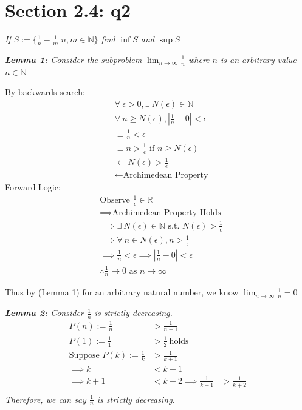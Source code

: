 \documentclass[11pt]{article}
\newcommand{\question}[1]{
    \begin{mdframed}[
        linecolor=gray,       %
        linewidth=0.5pt,      %
        innertopmargin=10pt,  %
        innerbottommargin=10pt %
    ]
    \centering \itshape \color{gray} #1
    \end{mdframed}
}
\newcommand{\subp}[1]{
    \begin{mdframed}[
        linewidth=0.5pt,      %
        innertopmargin=10pt,  %
        innerbottommargin=10pt %
    ]
    \centering \itshape #1
    \end{mdframed}
}
\theoremstyle{plain}
\begin{document}
\section*{Section 2.4: q2}
\question{If $S := \{ \frac{1}{n}-\frac{1}{m} | n,m \in \mathbb{N} \}$ find $\inf S$ and $\sup S$}
\pagebreak
\subp{
	\textbf{Lemma 1:} Consider the subproblem  $\lim_{n \to \infty} \frac{1}{n}$ where $n$ is an arbitrary value $n \in \mathbb{N}$

	By backwards search:
	$$
		\begin{aligned}
			 & \forall ~\epsilon > 0, \exists ~N(\epsilon) \in \mathbb{N}    \\
			 & \forall ~ n \geq N(\epsilon), |\frac{1}{n} - 0 | < \epsilon   \\
			 & \equiv \frac{1}{n}<\epsilon                                   \\
			 & \equiv n > \frac{1}{\epsilon} \text{ if } n \geq  N(\epsilon) \\
			 & \leftarrow N(\epsilon) > \frac{1}{\epsilon}                   \\
			 & \leftarrow \text{Archimedean Property}
		\end{aligned}
	$$
	Forward Logic:
	$$
		\begin{aligned}
			 & \text{Observe } \frac{1}{\epsilon} \in \mathbb{R}                                             \\
			 & \implies \text{Archimedean Property Holds}                                                    \\
			 & \implies  \exists ~ N(\epsilon) \in \mathbb{N} \text{ s.t. } N(\epsilon) > \frac{1}{\epsilon} \\
			 & \implies \forall ~n \in N(\epsilon), n > \frac{1}{\epsilon}                                   \\
			 & \implies \frac{1}{n} < \epsilon \implies |\frac{1}{n}-0| < \epsilon                           \\
			 & \therefore \frac{1}{n} \rightarrow 0 \text{ as } n \rightarrow \infty
		\end{aligned}
	$$
}

Thus by (Lemma 1) for an arbitrary natural number, we know $\lim_{n \to \infty} \frac{1}{n} = 0$ \\

\subp{
	\textbf{Lemma 2: } Consider $\frac{1}{n}$ is strictly decreasing. \\
	\[
		\begin{aligned}
			P(n) := \frac{1}{n}                 & > \frac{1}{n+1}              \\
			P(1) := \frac{1}{1}                 & > \frac{1}{2} ~ \text{holds} \\
			\text{Suppose } P(k) := \frac{1}{k} & > \frac{1}{k+1}              \\
			\implies k                          & < k+1                        \\
			\implies k+1                        & < k+2
			\implies \frac{1}{k+1}              & > \frac{1}{k+2}              \\
		\end{aligned}
	\]
	Therefore, we can say $\frac{1}{n}$ is strictly decreasing.
}
\end{document}
